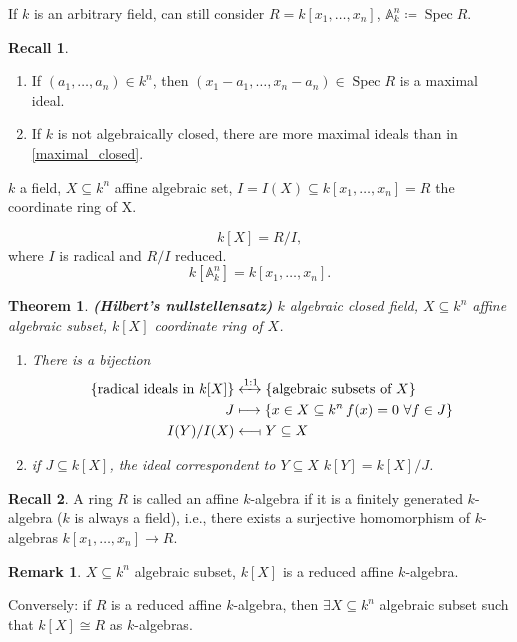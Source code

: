 \documentclass[12pt]{article}
\DeclareMathOperator{\Spec}{Spec}
\newtheorem*{theorem}{Theorem}
\theoremstyle{definition}
\newtheorem*{remark}{Remark}
\newtheorem*{recall}{Recall}
\theoremstyle{remark}
\begin{document}
If $k$ is an arbitrary field, can still consider $R=k[x_1,\ldots,x_n]$, $\mathbb{A}_k^n\coloneqq\Spec R$.

\begin{recall}
\begin{enumerate}[label=\arabic*)]
\item\label{maximal_closed} If $(a_1,\ldots,a_n)\in k^n$, then $(x_1-a_1,\ldots,x_n-a_n)\in\Spec R$ is a maximal ideal.

\item If $k$ is not algebraically closed, there are more maximal ideals than in \ref{maximal_closed}.
\end{enumerate}
\end{recall}

$k$ a field, $X\subseteq k^n$ affine algebraic set, $I=I(X)\subseteq k[x_1,\ldots,x_n]=R$ the coordinate ring of X.

\[k[X]=R/I,\]
where $I$ is radical and $R/I$ reduced.
\[k[\mathbb{A}_k^n]=k[x_1,\ldots,x_n].\]

\begin{theorem}
\emph{\textbf{(Hilbert's nullstellensatz)}} $k$ algebraic closed field, $X\subseteq k^n$ affine algebraic subset, $k[X]$ coordinate ring of $X$.

\begin{enumerate}[label=\arabic*)]
\item There is a bijection
\begin{align*}
\{\text{radical ideals in }k[X]\}&\xleftrightarrow{1:1}\{\text{algebraic subsets of }X\}\\
J&\longmapsto\{x\in X\subseteq k^n\,f(x)=0\ \forall f\in J\}\\
I(Y)/I(X)&\longleftarrow\!\shortmid Y\subseteq X
\end{align*}

\item if $J\subseteq k[X]$, the ideal correspondent to $Y\subseteq X$ $k[Y]=k[X]/J$.
\end{enumerate}
\end{theorem}

\begin{recall}
A ring $R$ is called an affine $k$-algebra if it is a finitely generated $k$-algebra ($k$ is always a field), i.e., there exists a surjective homomorphism of $k$-algebras $k[x_1,\ldots,x_n]\rightarrow R$.
\end{recall}

\begin{remark}
$X\subseteq k^n$ algebraic subset, $k[X]$ is a reduced affine $k$-algebra.

Conversely: if $R$ is a reduced affine $k$-algebra, then $\exists X\subseteq k^n$ algebraic subset such that $k[X]\cong R$ as $k$-algebras.
\end{remark}
\end{document}
